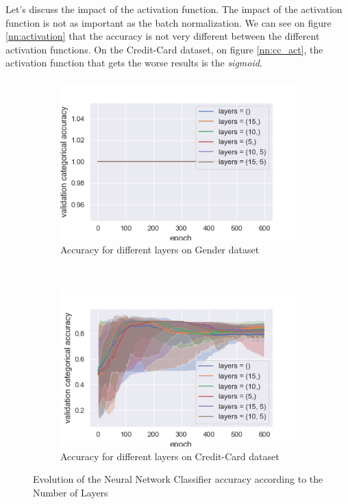 \documentclass[10pt]{article}
\begin{document}
			Let's discuss the impact of the activation function. The impact of the activation function is not as important as the batch normalization. We can see on figure \ref{nn:activation} that the accuracy is not very different between the different activation functions. On the Credit-Card dataset, on figure \ref{nn:cc_act}, the activation function that gets the worse results is the \textit{sigmoid}.
		\paragraph*{}
			\begin{figure}[h]
				\centering
				\begin{subfigure}[]{0.45\columnwidth}
					\centering
					\includegraphics[width=\linewidth]{../graphics/per_gender_epoch_score_type_layers.png}
					\caption{Accuracy for different layers on Gender dataset}
					\label{nn:g_layers}
				\end{subfigure}
				~
				\begin{subfigure}[]{0.45\columnwidth}
					\centering
					\includegraphics[width=\linewidth]{../graphics/per_creditcard_epoch_score_type_layers.png}
					\caption{Accuracy for different layers on Credit-Card dataset}
					\label{nn:cc_layers}
				\end{subfigure}
				\caption{Evolution of the Neural Network Classifier accuracy according to the Number of Layers}
				\label{nn:layers}
			\end{figure}
\end{document}
